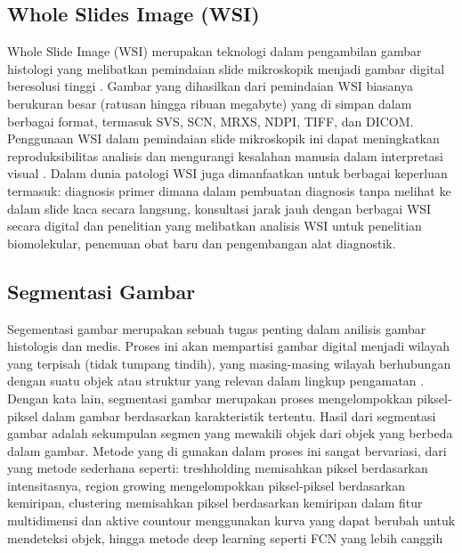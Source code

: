 \subsection{Whole Slides Image (WSI)}

\noindent Whole Slide Image (WSI) merupakan teknologi dalam pengambilan gambar histologi yang melibatkan pemindaian slide mikroskopik menjadi gambar digital beresolusi tinggi \cite{hanna_whole_2020}. Gambar yang dihasilkan dari pemindaian WSI biasanya berukuran besar (ratusan hingga ribuan megabyte) yang di simpan dalam berbagai format, termasuk SVS, SCN, MRXS, NDPI, TIFF, dan DICOM. Penggunaan WSI dalam pemindaian slide mikroskopik ini dapat meningkatkan reproduksibilitas analisis dan mengurangi kesalahan manusia dalam interpretasi visual \cite{li_hardware-software_2023}. Dalam dunia patologi WSI juga dimanfaatkan untuk berbagai keperluan termasuk: diagnosis primer dimana dalam pembuatan diagnosis tanpa melihat ke dalam slide kaca secara langsung, konsultasi jarak jauh dengan berbagai WSI secara digital dan penelitian yang melibatkan analisis WSI untuk penelitian biomolekular, penemuan obat baru dan pengembangan alat diagnostik.


 
\subsection{Segmentasi Gambar}

\noindent Segementasi gambar merupakan sebuah tugas penting dalam anilisis gambar histologis dan medis. Proses ini akan mempartisi gambar digital menjadi wilayah yang terpisah (tidak tumpang tindih), yang masing-masing wilayah  berhubungan dengan suatu objek atau struktur yang relevan dalam lingkup pengamatan \cite{wu_image_2023}. Dengan kata lain, segmentasi gambar merupakan proses mengelompokkan piksel-piksel dalam gambar berdasarkan karakteristik tertentu. Hasil dari segmentasi gambar adalah sekumpulan segmen yang mewakili objek dari objek yang berbeda dalam gambar. Metode yang di gunakan dalam proses ini sangat bervariasi, dari yang metode sederhana seperti: treshholding memisahkan piksel berdasarkan intensitasnya, region growing mengelompokkan piksel-piksel berdasarkan kemiripan, clustering memisahkan piksel berdasarkan kemiripan dalam fitur multidimensi dan aktive countour menggunakan kurva yang dapat berubah untuk mendeteksi objek, hingga metode deep learning seperti FCN yang lebih canggih \cite{huang_fully_2022,wang_comprehensive_2022}

